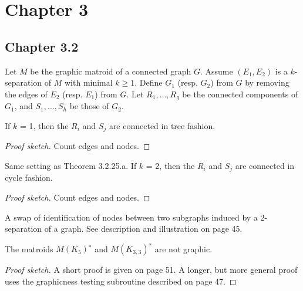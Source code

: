 \section{Chapter 3}

\subsection{Chapter 3.2}

\begin{theorem}[3.2.25.a]
  \label{thm:3.2.25.a}
  Let $M$ be the graphic matroid of a connected graph $G$. Assume $(E_{1}, E_{2})$ is a $k$-separation of $M$ with minimal $k \geq 1$. Define $G_{1}$ (resp. $G_{2}$) from $G$ by removing the edges of $E_{2}$ (resp. $E_{1}$) from $G$. Let $R_{1}, \dots, R_{g}$ be the connected components of $G_{1}$, and $S_{1}, \dots, S_{h}$ be those of $G_{2}$.

  If $k$ = 1, then the $R_{i}$ and $S_{j}$ are connected in tree fashion.
\end{theorem}

\begin{proof}[Proof sketch]
  Count edges and nodes.
\end{proof}

\begin{theorem}[3.2.25.b]
  \label{thm:3.2.25.b}
  Same setting as Theorem 3.2.25.a. If $k$ = 2, then the $R_{i}$ and $S_{j}$ are connected in cycle fashion.
\end{theorem}

\begin{proof}[Proof sketch]
  Count edges and nodes.
\end{proof}

\begin{definition}
  \label{switching op sec 3}
  A swap of identification of nodes between two subgraphs induced by a $2$-separation of a graph. See description and illustration on page 45.
\end{definition}

\begin{lemma}[3.2.48]
  \label{lem:3.2.48}
  The matroids $M(K_{5})^{∗}$ and $M(K_{3,3})^{∗}$ are not graphic.
\end{lemma}

\begin{proof}[Proof sketch]
  A short proof is given on page 51. A longer, but more general proof uses the graphicness testing subroutine described on page 47.
\end{proof}


